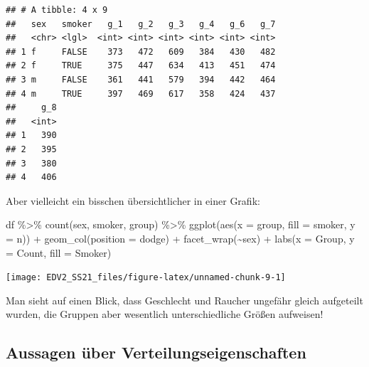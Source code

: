 \documentclass[
]{book}
\newenvironment{Shaded}{\begin{snugshade}}{\end{snugshade}}
\newcommand{\AttributeTok}[1]{\textcolor[rgb]{0.77,0.63,0.00}{#1}}
\newcommand{\FunctionTok}[1]{\textcolor[rgb]{0.00,0.00,0.00}{#1}}
\newcommand{\NormalTok}[1]{#1}
\newcommand{\SpecialCharTok}[1]{\textcolor[rgb]{0.00,0.00,0.00}{#1}}
\newcommand{\StringTok}[1]{\textcolor[rgb]{0.31,0.60,0.02}{#1}}
\begin{document}
\begin{verbatim}
## # A tibble: 4 x 9
##   sex   smoker   g_1   g_2   g_3   g_4   g_6   g_7
##   <chr> <lgl>  <int> <int> <int> <int> <int> <int>
## 1 f     FALSE    373   472   609   384   430   482
## 2 f     TRUE     375   447   634   413   451   474
## 3 m     FALSE    361   441   579   394   442   464
## 4 m     TRUE     397   469   617   358   424   437
##     g_8
##   <int>
## 1   390
## 2   395
## 3   380
## 4   406
\end{verbatim}

Aber vielleicht ein bisschen übersichtlicher in einer Grafik:

\begin{Shaded}
\begin{Highlighting}[]
\NormalTok{df }\SpecialCharTok{\%\textgreater{}\%} 
  \FunctionTok{count}\NormalTok{(sex, smoker, group) }\SpecialCharTok{\%\textgreater{}\%} 
  \FunctionTok{ggplot}\NormalTok{(}\FunctionTok{aes}\NormalTok{(}\AttributeTok{x =}\NormalTok{ group, }\AttributeTok{fill =}\NormalTok{ smoker, }\AttributeTok{y =}\NormalTok{ n)) }\SpecialCharTok{+}
  \FunctionTok{geom\_col}\NormalTok{(}\AttributeTok{position =} \StringTok{\textquotesingle{}dodge\textquotesingle{}}\NormalTok{) }\SpecialCharTok{+}
  \FunctionTok{facet\_wrap}\NormalTok{(}\SpecialCharTok{\textasciitilde{}}\NormalTok{sex) }\SpecialCharTok{+}
  \FunctionTok{labs}\NormalTok{(}\AttributeTok{x =} \StringTok{\textquotesingle{}Group\textquotesingle{}}\NormalTok{,}
       \AttributeTok{y =} \StringTok{\textquotesingle{}Count\textquotesingle{}}\NormalTok{,}
       \AttributeTok{fill =} \StringTok{\textquotesingle{}Smoker\textquotesingle{}}\NormalTok{)}
\end{Highlighting}
\end{Shaded}

\begin{center}\texttt{[image: EDV2\_SS21\_files/figure-latex/unnamed-chunk-9-1]} \end{center}

Man sieht auf einen Blick, dass Geschlecht und Raucher ungefähr gleich aufgeteilt wurden, die Gruppen aber wesentlich unterschiedliche Größen aufweisen!

\hypertarget{aussagen-uxfcber-verteilungseigenschaften}{%
\subsection{Aussagen über Verteilungseigenschaften}\label{aussagen-uxfcber-verteilungseigenschaften}}
\end{document}
